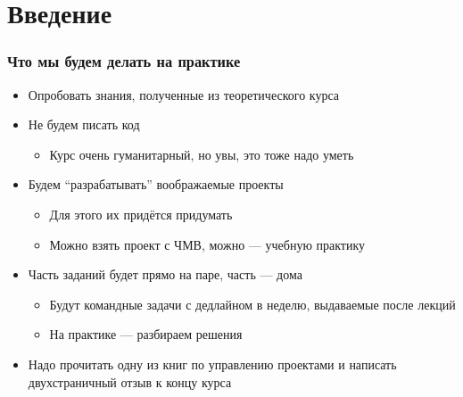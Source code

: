 \documentclass{../../slides-style}
\begin{document}
    \begin{frame}[plain]
        \titlepage
    \end{frame}

    \section{Введение}

    \begin{frame}
        \frametitle{Что мы будем делать на практике}
        \begin{itemize}
            \item Опробовать знания, полученные из теоретического курса
            \item Не будем писать код
            \begin{itemize}
                \item Курс очень гуманитарный, но увы, это тоже надо уметь
            \end{itemize}
            \item Будем \enquote{разрабатывать} воображаемые проекты
            \begin{itemize}
                \item Для этого их придётся придумать
                \item Можно взять проект с ЧМВ, можно --- учебную практику
            \end{itemize}
            \item Часть заданий будет прямо на паре, часть --- дома
            \begin{itemize}
                \item Будут командные задачи с дедлайном в неделю, выдаваемые после лекций
                \item На практике --- разбираем решения
            \end{itemize}
            \item Надо прочитать одну из книг по управлению проектами и написать двухстраничный отзыв к концу курса
        \end{itemize}
    \end{frame}
\end{document}
